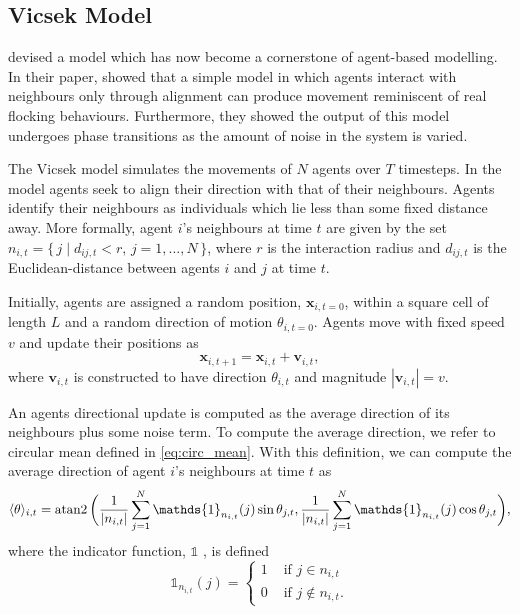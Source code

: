 \subsection{Vicsek Model}
\label{sec:vicsek_model}

\textcite{vicsek95} devised a model which has now become a cornerstone of agent-based modelling. In 
their paper, \textcite{vicsek95} showed that a simple model in which agents interact with neighbours 
only through alignment can produce movement reminiscent of real flocking behaviours. Furthermore, 
they showed the output of this model undergoes phase transitions as the amount of noise in the system 
is varied.

The Vicsek model simulates the movements of $N$ agents over $T$ timesteps. In the model agents seek 
to align their direction with that of their neighbours. Agents identify their neighbours as 
individuals which lie less than some fixed distance away. More formally, agent $i$'s neighbours at 
time $t$ are given by the set $n_{i,t} = \{\,j \mid d_{ij, t} < r, \, j=1,\ldots,N \,\}$, where $r$ 
is the interaction radius and $d_{ij, t}$ is the Euclidean-distance between agents $i$ and $j$ at 
time $t$.

Initially, agents are assigned a random position, $\bm{x}_{i, t=0}$, within a square cell of length 
$L$ and a random direction of motion $\theta_{i, t=0}$. Agents move with fixed speed $v$ and update 
their positions as
\begin{equation}\label{eq:pos_update}
	\bm{x}_{i, t+1} = \bm{x}_{i, t} + \bm{v}_{i, t},
\end{equation}
where $\bm{v}_{i, t}$ is constructed to have direction $\theta_{i, t}$ and magnitude $|\bm{v}_{i, 
t}| = v$.

An agents directional update is computed as the average direction of its neighbours plus some noise 
term. To compute the average direction, we refer to circular mean defined in \cref{eq:circ_mean}. 
With this definition, we can compute the average direction of agent $i$'s neighbours at time $t$ as
\begin{equation}
\label{eq:vicsek_average}
	\langle \theta \rangle_{i, t} = \atantwo \bigg( \frac{1}{|n_{i, t}|} \sum_{j=1}^N \mathds{1}_{n_{i, 
t}}(j) \sin{\theta_{j ,t}}, \frac{1}{|n_{i, t}|} \sum_{j=1}^N \mathds{1}_{n_{i, t}}(j)  
\cos{\theta_{j, t}} \bigg),
\end{equation}
where the indicator function, $\mathds{1}$ , is defined
\begin{equation*}
	\mathds{1}_{n_{i, t}}(j) =
	\begin{cases}
		1 & \text{ if } j \in n_{i, t} \\
		0 & \text{ if } j \notin n_{i, t}.
	\end{cases}
\end{equation*}

